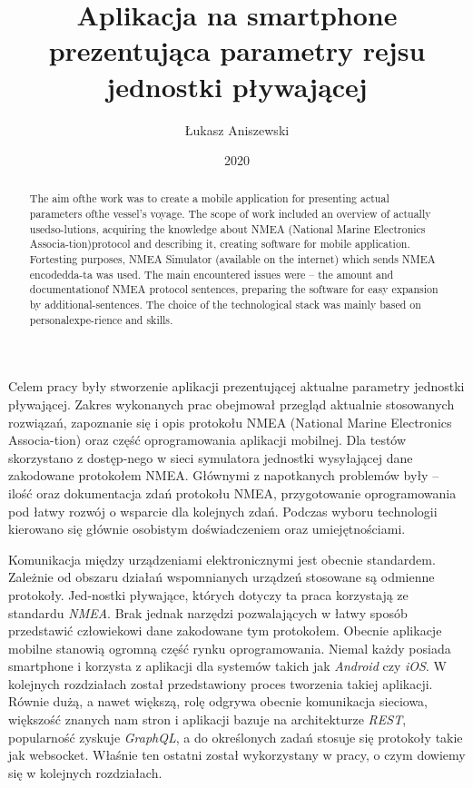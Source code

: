 \documentclass[skorowidz,skroty]{dyplomWEZUT}
\author{Łukasz Aniszewski}
\title{Aplikacja na smartphone prezentująca parametry rejsu jednostki pływającej}
\date{2020}
\begin{document}
\begin{streszczenie}
Celem pracy były stworzenie aplikacji prezentującej aktualne parametry jednostki pływającej. Zakres wykonanych prac obejmował przegląd aktualnie stosowanych rozwiązań, zapoznanie się i opis protokołu NMEA (National Marine Electronics Associa-tion) oraz część oprogramowania aplikacji mobilnej. Dla testów skorzystano z dostęp-nego   w sieci symulatora jednostki wysyłającej dane zakodowane protokołem NMEA. Głównymi z napotkanych problemów były – ilość oraz dokumentacja zdań protokołu NMEA, przygotowanie oprogramowania pod łatwy rozwój o wsparcie dla kolejnych zdań. Podczas wyboru technologii kierowano się głównie osobistym doświadczeniem oraz umiejętnościami. 
\end{streszczenie}

\begin{abstract}
The aim ofthe work was to create a mobile application for presenting actual parameters ofthe vessel's voyage. The scope of work included an overview of actually usedso-lutions, acquiring the knowledge about NMEA (National Marine Electronics Associa-tion)protocol and describing it, creating software for mobile application. Fortesting purposes, NMEA Simulator (available on the internet) which sends NMEA encodedda-ta was used. The main encountered issues were – the amount and documentationof NMEA protocol sentences, preparing the software for easy expansion by additional-sentences. The choice of the technological stack was mainly based on personalexpe-rience and skills.
\end{abstract}

\maketitle

\begin{wprowadzenie}

Komunikacja między urządzeniami elektronicznymi jest obecnie standardem. Zależnie od obszaru działań wspomnianych urządzeń stosowane są odmienne protokoły. Jed-nostki pływające, których dotyczy ta praca korzystają ze standardu \textit{NMEA}. Brak jednak narzędzi pozwalających w łatwy sposób przedstawić człowiekowi dane zakodowane tym protokołem. Obecnie aplikacje mobilne stanowią ogromną część rynku oprogramowania. Niemal każdy posiada smartphone i korzysta z aplikacji dla systemów takich jak \textit{Android} czy \textit{iOS}. W kolejnych rozdziałach został przedstawiony proces tworzenia takiej aplikacji. Równie dużą, a nawet większą, rolę odgrywa obecnie komunikacja sieciowa, większość znanych nam stron i aplikacji bazuje na architekturze \textit{REST}, popularność zyskuje \textit{GraphQL}, a do określonych zadań stosuje się protokoły takie jak websocket. Właśnie ten ostatni został wykorzystany w pracy, o czym dowiemy się w kolejnych rozdziałach. 

\end{wprowadzenie}
\end{document}
